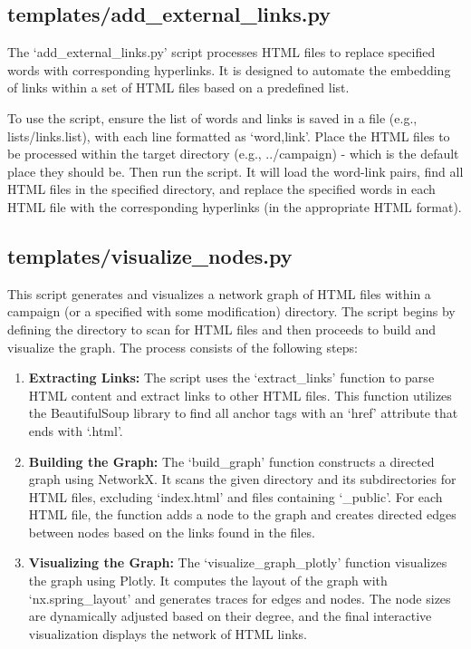 \subsection{templates/add\_external\_links.py}

The `add\_external\_links.py' script processes HTML files to replace specified words with corresponding hyperlinks. It is designed to automate the embedding of links within a set of HTML files based on a predefined list. 

To use the script, ensure the list of words and links is saved in a file (e.g., lists/links.list), with each line formatted as `word,link'. Place the HTML files to be processed within the target directory (e.g., ../campaign) - which is the default place they should be. Then run the script. It will load the word-link pairs, find all HTML files in the specified directory, and replace the specified words in each HTML file with the corresponding hyperlinks (in the appropriate HTML format).










\subsection{templates/visualize\_nodes.py}

This script generates and visualizes a network graph of HTML files within a campaign (or a specified with some modification) directory. The script begins by defining the directory to scan for HTML files and then proceeds to build and visualize the graph. The process consists of the following steps:

\begin{enumerate}
    \item \textbf{Extracting Links:} The script uses the `extract\_links' function to parse HTML content and extract links to other HTML files. This function utilizes the BeautifulSoup library to find all anchor tags with an `href' attribute that ends with `.html'.
    
    \item \textbf{Building the Graph:} The `build\_graph' function constructs a directed graph using NetworkX. It scans the given directory and its subdirectories for HTML files, excluding `index.html' and files containing `\_public'. For each HTML file, the function adds a node to the graph and creates directed edges between nodes based on the links found in the files.
    
    \item \textbf{Visualizing the Graph:} The `visualize\_graph\_plotly' function visualizes the graph using Plotly. It computes the layout of the graph with `nx.spring\_layout' and generates traces for edges and nodes. The node sizes are dynamically adjusted based on their degree, and the final interactive visualization displays the network of HTML links.
\end{enumerate}

